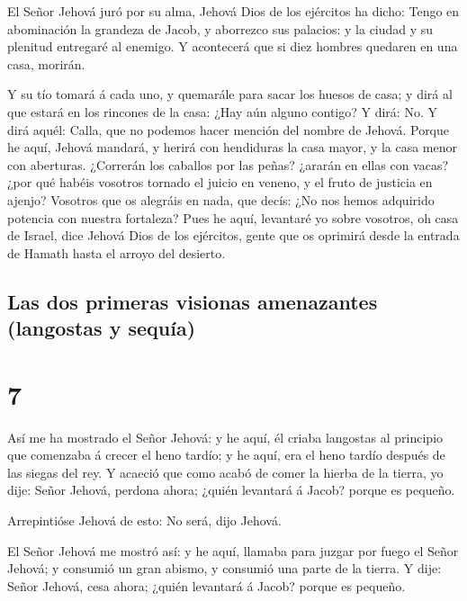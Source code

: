  El Señor Jehová juró por su alma, Jehová Dios de los
ejércitos ha dicho: Tengo en abominación la grandeza de Jacob, y
aborrezco sus palacios: y la ciudad y su plenitud entregaré al enemigo.
 Y acontecerá que si diez hombres quedaren en una casa,
morirán.

 Y su tío tomará á cada uno, y quemarále para sacar los
huesos de casa; y dirá al que estará en los rincones de la casa: ¿Hay
aún alguno contigo? Y dirá: No. Y dirá aquél: Calla, que no podemos
hacer mención del nombre de Jehová.  Porque he aquí,
Jehová mandará, y herirá con hendiduras la casa mayor, y la casa menor
con aberturas.  ¿Correrán los caballos por las peñas?
¿ararán en ellas con vacas? ¿por qué habéis vosotros tornado el juicio
en veneno, y el fruto de justicia en ajenjo?  Vosotros
que os alegráis en nada, que decís: ¿No nos hemos adquirido potencia con
nuestra fortaleza?  Pues he aquí, levantaré yo sobre
vosotros, oh casa de Israel, dice Jehová Dios de los ejércitos, gente
que os oprimirá desde la entrada de Hamath hasta el arroyo del desierto.

\hypertarget{las-dos-primeras-visionas-amenazantes-langostas-y-sequuxeda}{%
\subsection{Las dos primeras visionas amenazantes (langostas y
sequía)}\label{las-dos-primeras-visionas-amenazantes-langostas-y-sequuxeda}}

\hypertarget{section-6}{%
\section{7}\label{section-6}}

 Así me ha mostrado el Señor Jehová: y he aquí, él criaba
langostas al principio que comenzaba á crecer el heno tardío; y he aquí,
era el heno tardío después de las siegas del rey.  Y
acaeció que como acabó de comer la hierba de la tierra, yo dije: Señor
Jehová, perdona ahora; ¿quién levantará á Jacob? porque es pequeño.

 Arrepintióse Jehová de esto: No será, dijo Jehová.

 El Señor Jehová me mostró así: y he aquí, llamaba para
juzgar por fuego el Señor Jehová; y consumió un gran abismo, y consumió
una parte de la tierra.  Y dije: Señor Jehová, cesa ahora;
¿quién levantará á Jacob? porque es pequeño.


